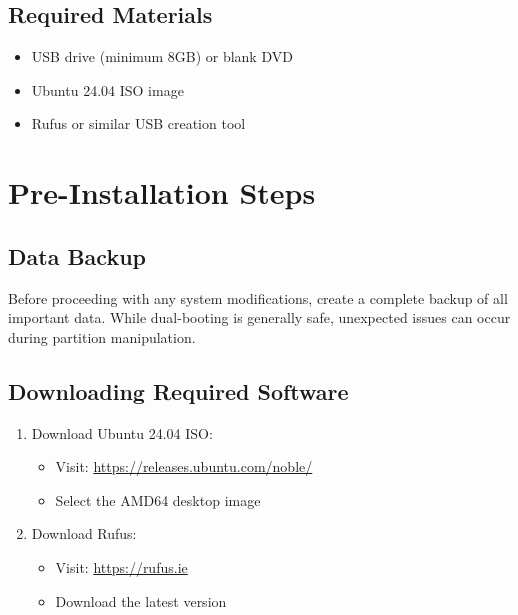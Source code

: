 \documentclass[11pt,a4paper]{article}
\newenvironment{warning}
{\begin{tcolorbox}[colback=warningcolor!10,colframe=warningcolor,title=\textbf{Warning}]}
{\end{tcolorbox}}
\newenvironment{note}
{\begin{tcolorbox}[colback=notecolor!10,colframe=notecolor,title=\textbf{Note}]}
{\end{tcolorbox}}
\begin{document}
\subsection{Required Materials}
\begin{itemize}
    \item USB drive (minimum 8GB) or blank DVD
    \item Ubuntu 24.04 ISO image
    \item Rufus or similar USB creation tool
\end{itemize}

\section{Pre-Installation Steps}
\subsection{Data Backup}
\begin{warning}
Before proceeding with any system modifications, create a complete backup of all important data. While dual-booting is generally safe, unexpected issues can occur during partition manipulation.
\end{warning}

\subsection{Downloading Required Software}
\begin{enumerate}
    \item Download Ubuntu 24.04 ISO:
    \begin{itemize}
        \item Visit: \url{https://releases.ubuntu.com/noble/}
        \item Select the AMD64 desktop image
    \end{itemize}
    \item Download Rufus:
    \begin{itemize}
        \item Visit: \url{https://rufus.ie}
        \item Download the latest version
    \end{itemize}
\end{enumerate}
\end{document}
